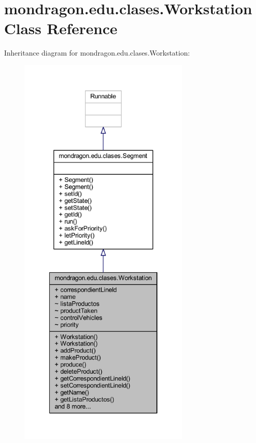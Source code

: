 \hypertarget{classmondragon_1_1edu_1_1clases_1_1_workstation}{}\section{mondragon.\+edu.\+clases.\+Workstation Class Reference}
\label{classmondragon_1_1edu_1_1clases_1_1_workstation}


Inheritance diagram for mondragon.\+edu.\+clases.\+Workstation\+:\nopagebreak
\begin{figure}[H]
\begin{center}
\leavevmode
\includegraphics[height=550pt]{classmondragon_1_1edu_1_1clases_1_1_workstation__inherit__graph}
\end{center}
\end{figure}


